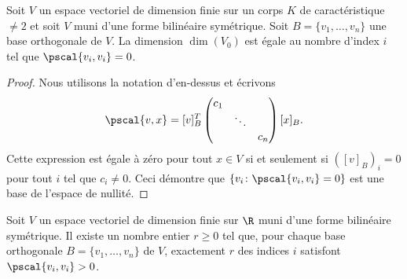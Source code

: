 \begin{theorem}
  \label{thr:9}
  Soit $V$
  un espace vectoriel de dimension finie sur un corps $K$
  de caractéristique $\neq 2$
  et soit $V$
  muni d'une forme bilinéaire symétrique. Soit $B = \{v_1,\dots,v_n\}$
  une base orthogonale de $V$.
  La dimension $\dim(V_0)$
  est égale au nombre d'index $i$ tel que $\pscal{v_i,v_i}=0$.
\end{theorem}

\begin{proof}
  Nous utilisons la notation d'en-dessus et écrivons 
  \begin{displaymath}
    \pscal{v,x} =   [v]_B^T
                    \begin{pmatrix}
                      c_1 & & \\
                                     & \ddots & \\
                                     & & c_n
                    \end{pmatrix} [x]_B. 
  \end{displaymath}
Cette expression est égale à zéro pour tout $x ∈V$  si et seulement si $\left([v]_B\right)_i = 0$ pour tout $i$ tel que $c_i \neq 0$. Ceci démontre que $\{ v_i \colon \pscal{v_i,v_i}=0\}$ est une base de l'espace de nullité. 
\end{proof}



\begin{theorem} 
\label{thr:10}
Soit $V$
un espace vectoriel de dimension finie sur $\R$
muni d'une forme bilinéaire symétrique.
Il existe un nombre entier $r ≥0$ tel que, pour chaque base orthogonale 
  $B = \{v_1,\dots,v_n\}$ de $V$, 
 exactement $r$ des indices $i$ satisfont $\pscal{v_i,v_i}>0$.
\end{theorem}


